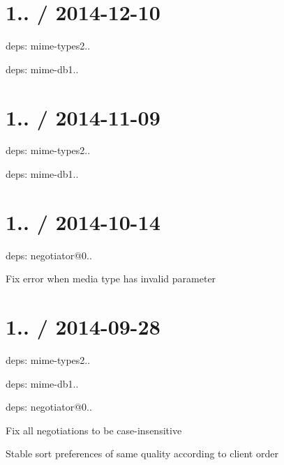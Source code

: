 \section*{1.. / 2014-\/12-\/10 }


\begin{DoxyItemize}
\item deps\+: mime-\/types2..
\begin{DoxyItemize}
\item deps\+: mime-\/db1..
\end{DoxyItemize}
\end{DoxyItemize}

\section*{1.. / 2014-\/11-\/09 }


\begin{DoxyItemize}
\item deps\+: mime-\/types2..
\begin{DoxyItemize}
\item deps\+: mime-\/db1..
\end{DoxyItemize}
\end{DoxyItemize}

\section*{1.. / 2014-\/10-\/14 }


\begin{DoxyItemize}
\item deps\+: negotiator@0..
\begin{DoxyItemize}
\item Fix error when media type has invalid parameter
\end{DoxyItemize}
\end{DoxyItemize}

\section*{1.. / 2014-\/09-\/28 }


\begin{DoxyItemize}
\item deps\+: mime-\/types2..
\begin{DoxyItemize}
\item deps\+: mime-\/db1..
\end{DoxyItemize}
\item deps\+: negotiator@0..
\begin{DoxyItemize}
\item Fix all negotiations to be case-\/insensitive
\item Stable sort preferences of same quality according to client order
\end{DoxyItemize}
\end{DoxyItemize}

